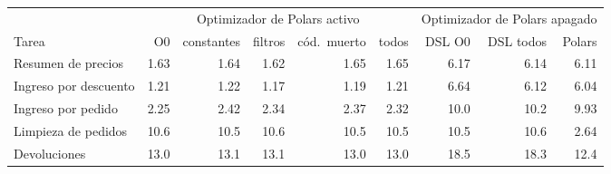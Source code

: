 \begin{tabular}{@{}lrrrrr@{\hspace{1.2em}}rrr@{}}
\toprule
 & \multicolumn{5}{c}{Optimizador de Polars activo} & \multicolumn{3}{c}{Optimizador de Polars apagado} \\
\cmidrule(lr){2-6}\cmidrule(l){7-9}
Tarea & O0 & constantes & filtros & cód.\ muerto & todos & DSL O0 & DSL todos & Polars \\
\midrule
Resumen de precios & 1.63 & 1.64 & 1.62 & 1.65 & 1.65 & 6.17 & 6.14 & 6.11 \\
Ingreso por descuento & 1.21 & 1.22 & 1.17 & 1.19 & 1.21 & 6.64 & 6.12 & 6.04 \\
Ingreso por pedido & 2.25 & 2.42 & 2.34 & 2.37 & 2.32 & 10.0 & 10.2 & 9.93 \\
Limpieza de pedidos & 10.6 & 10.5 & 10.6 & 10.5 & 10.5 & 10.5 & 10.6 & 2.64 \\
Devoluciones & 13.0 & 13.1 & 13.1 & 13.0 & 13.0 & 18.5 & 18.3 & 12.4 \\
\bottomrule
\end{tabular}